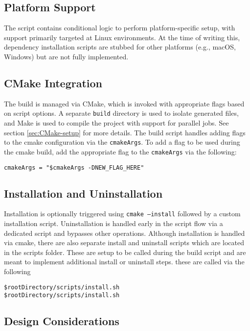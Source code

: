 \subsection{Platform Support}

The script contains conditional logic to perform platform-specific setup, with support primarily targeted at Linux environments. At the time of writing this, dependency installation scripts are stubbed for other platforms (e.g., macOS, Windows) but are not fully implemented.

\subsection{CMake Integration}

The build is managed via CMake, which is invoked with appropriate flags based on script options. A separate \texttt{build} directory is used to isolate generated files, and Make is used to compile the project with support for parallel jobs. See section \ref{sec:CMake-setup} for more details. The build script handles adding flags to the cmake configuration via the \texttt{cmakeArgs}. To add a flag to be used during the cmake build, add the appropriate flag to the \texttt{cmakeArgs} via the following:
\begin{lstlisting}[style=shellstyle]
cmakeArgs = "$cmakeArgs -DNEW_FLAG_HERE"
\end{lstlisting}

\subsection{Installation and Uninstallation}

Installation is optionally triggered using \texttt{cmake --install} followed by a custom installation script. Uninstallation is handled early in the script flow via a dedicated script and bypasses other operations. Although installation is handled via cmake, there are also separate install and uninstall scripts which are located in the scripts folder. These are setup to be called during the build script and are meant to implement additional install or uninstall steps. these are called via the following

\begin{lstlisting}[style=shellstyle]
$rootDirectory/scripts/install.sh
$rootDirectory/scripts/install.sh
\end{lstlisting}

\subsection{Design Considerations}


